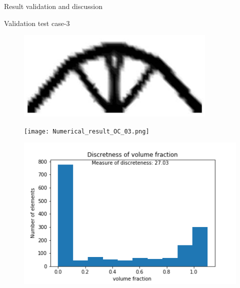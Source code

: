 \documentclass[a4paper,12pt,times]{article}
\begin{document}
\begin{section}{Result validation and discussion}
\begin{subsection}{Validation test case-3}
\begin{figure}[H]
	\centering
	\begin{minipage}{.5\textwidth}
		\centering
		\includegraphics[width=1\linewidth]{analytical_3.png}
		\label{VC-06.1}
	\end{minipage}%
	\begin{minipage}{.5\textwidth}
		\centering
		\texttt{[image: Numerical\_result\_OC\_03.png]}
		\label{VC-06.2}
	\end{minipage}
\end{figure} 
\begin{figure}[H]
	\centering
	\begin{minipage}{.5\textwidth}
		\centering
		\includegraphics[width=1\linewidth]{OC_03_discretness.png}
		\label{VC-06.5}
	\end{minipage}%

\end{figure}
\end{subsection}
\end{section}
\end{document}
